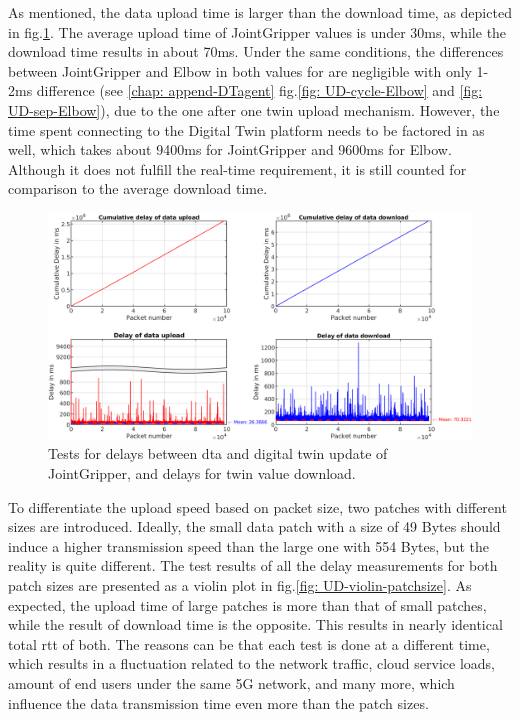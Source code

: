 As mentioned, the data upload time is larger than the download time, as depicted in 
fig.\ref{fig: UD-sep-JointGripper}. The average upload time of JointGripper values is under 30ms, 
while the download time results in about 70ms. Under the same conditions, the differences 
between JointGripper and Elbow in both values for are negligible with only 1-2ms difference (see \ref{chap: append-DTagent} fig.\ref{fig: UD-cycle-Elbow} 
and \ref{fig: UD-sep-Elbow}), due to the one after one twin upload mechanism. However, 
the time spent connecting to the Digital Twin platform needs to be factored in 
as well, which takes about 9400ms for JointGripper and 9600ms for Elbow. Although it 
does not fulfill the real-time requirement, it is still counted for comparison 
to the average download time.




\begin{figure}[htb]
    \includegraphics[width=\textwidth]{figures/tests/DT/Delay_UploadDownload_JointGripper.png}
    \centering
    \caption{Tests for delays between \gls{dta} and digital twin update of JointGripper, 
    and delays for twin value download. \label{fig: UD-sep-JointGripper}}
\end{figure}


To differentiate the upload speed based on packet size, two patches with 
different sizes are introduced. Ideally, the small data patch with a size of 
49 Bytes should induce a higher transmission speed than the large one with 554 Bytes, 
but the reality is quite different. The test results of all the 
delay measurements for both patch sizes are presented as a violin plot in 
fig.\ref{fig: UD-violin-patchsize}. As expected, the upload time of large 
patches is more than that of small patches, while the result of download time is 
the opposite. This results in nearly identical total \gls{rtt} of both. 
The reasons can be that each test is done at a different time, which results in a 
fluctuation related to the network traffic, cloud service loads, amount of end users 
under the same 5G network, and many more, which influence the data transmission time 
even more than the patch sizes.

